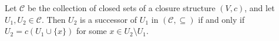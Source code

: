 Let $\mathcal{C}$ be the collection of closed sets of a closure structure $(V, c)$, and let $U_1, U_2 \in \mathcal{C}$. Then $U_2$ is a successor of $U_1$ in $(\mathcal{C}, \subseteq)$ if and only if $U_2 = c(U_1 \cup \{x\})$ for some $x \in U_2 \setminus U_1$.

